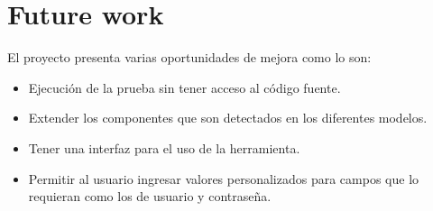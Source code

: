 \section{Future work}

El proyecto presenta varias oportunidades de mejora como lo son:

\begin{itemize}
	\item Ejecución de la prueba sin tener acceso al código fuente.
	\item Extender los componentes que son detectados en los diferentes modelos.
	\item Tener una interfaz para el uso de la herramienta.
	\item Permitir al usuario ingresar valores personalizados para campos que lo requieran como los de usuario y contraseña.
	
	
\end{itemize}

